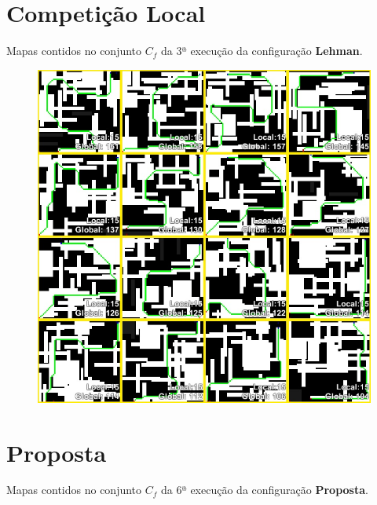 \FloatBarrier
\pagebreak

\section{Competição Local}

Mapas contidos no conjunto $C_f$ da 3ª execução da configuração \textbf{Lehman}.

\begin{figure}[htb]
	\begin{center}
		\includegraphics[width=1\textwidth]{Imagens/maps_lehman.jpg}
	\end{center}
\end{figure}

\FloatBarrier
\pagebreak

\section{Proposta}

Mapas contidos no conjunto $C_f$ da 6ª execução da configuração \textbf{Proposta}.

